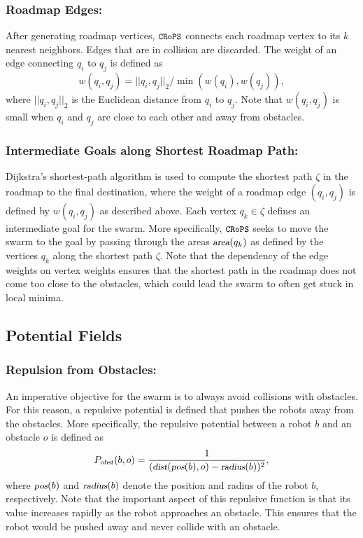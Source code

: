 \documentclass{llncs}
\newcommand{\Acronym}[1]{\ensuremath{{\small{\texttt{#1}}}}}
\newcommand{\Var}[1]{\ensuremath{{\small{\textsl{#1}}}}}
\newcommand{\Name}{\Acronym{CRoPS}}
\begin{document}
\subsubsection{Roadmap Edges:}
After generating roadmap vertices, $\Name$ connects each
roadmap vertex to its $k$ nearest neighbors. Edges that are in
collision are discarded. The weight of an edge connecting $q_i$ to
$q_j$ is defined as
$$
w(q_i, q_j) = ||q_i, q_j||_2 / \min(w(q_i), w(q_j)),
$$
where $||q_i, q_j||_2$ is the Euclidean distance from $q_i$ to $q_j$. Note
that $w(q_i, q_j)$ is small when $q_i$ and $q_j$ are close to each
other and away from obstacles.


\subsubsection{Intermediate Goals along Shortest Roadmap Path:} Dijkstra's shortest-path
algorithm is used to compute the shortest path $\zeta$ in the roadmap
to the final destination, where the weight of a roadmap edge $(q_i, q_j)$ is
defined by $w(q_i, q_j)$ as described above. Each vertex $q_k \in
\zeta$ defines an intermediate goal for the swarm. More specifically,
$\Name$ seeks to move the swarm to the goal by passing through the
areas $\Var{area}(q_k)$ as defined by the vertices $q_k$ along the
shortest path $\zeta$. Note that the dependency of the edge weights
on vertex weights ensures that the shortest path in the roadmap does
not come too close to the obstacles, which could lead the swarm to
often get stuck in local minima.

\subsection{Potential Fields}
\label{sec:PF}

\subsubsection{Repulsion from Obstacles:}
\label{sec:PFobst} An imperative objective for
the swarm is to always avoid collisions with obstacles. For this
reason, a repulsive potential is defined that pushes the robots away
from the obstacles. More specifically, the repulsive potential between
a robot $b$ and an obstacle $o$ is defined as
$$ P_\Var{obst}(b, o) = \frac{1}{(\Var{dist}(\Var{pos}(b), o) - \Var{radius}(b))^2},
$$ where $\Var{pos}(b)$ and
$\Var{radius}(b)$ denote the position and radius of the robot $b$, respectively. Note that the
important aspect of this repulsive function is that its value
increases rapidly as the robot approaches an obstacle. This ensures
that the robot would be pushed away and never collide with an obstacle.
\end{document}
